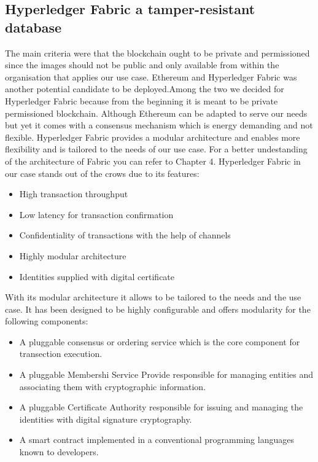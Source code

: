 \subsection{Hyperledger Fabric a tamper-resistant database}

  The main criteria were that the blockchain ought to be private and permissioned since the images should not be public and only available from within the organisation that applies our use case. Ethereum and Hyperledger Fabric was another potential candidate to be deployed.Among the two we decided for Hyperledger Fabric because from the beginning it is meant to be private permissioned blockchain. Although Ethereum can be adapted to serve our needs but yet it comes with a consensus mechanism which is energy demanding and not flexible. Hyperledger Fabric provides a modular architecture and enables more flexibility and is tailored to the needs of our use case. For a better undestanding of the architecture of Fabric you can refer to Chapter 4.  Hyperledger Fabric in our case stands out of the crows due to its features: 

\begin{itemize}
    \item High transaction throughput
    \item Low latency for transaction confirmation
    \item Confidentiality of transactions with the help of channels
    \item Highly modular architecture
    \item Identities supplied with digital certificate 
\end{itemize}

With its modular architecture it allows to be tailored to the needs and the use case. It has been designed to be highly configurable and offers modularity for the following components: 

\begin{itemize}
    \item A pluggable consensus or ordering service which is the core component for transection execution.
    \item A pluggable Membershi Service Provide responsible for managing entities and associating them with cryptographic information.
    \item A pluggable Certificate Authority responsible for issuing and managing the identities with digital signature cryptography.
     \item A smart contract implemented in a conventional programming languages known to developers. 
    
\end{itemize}



